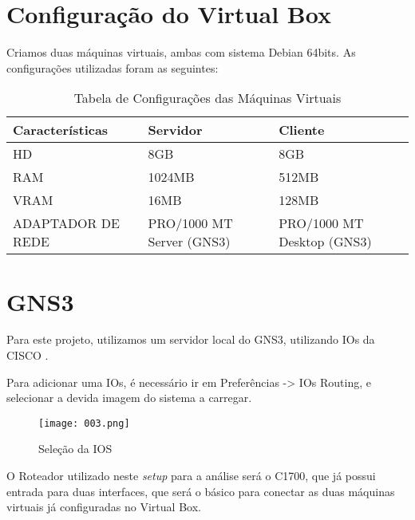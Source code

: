 \section{Configuração do Virtual Box}

Criamos duas máquinas virtuais, ambas com sistema Debian 64bits. As configurações utilizadas foram as seguintes:
   
\begin{table}[H]
\centering
\label{my-label}
\begin{tabular}{|l|l|l|}
\hline
Características   & Servidor                        & Cliente                          \\ \hline
HD                & 8GB                             & 8GB                              \\ \hline
RAM               & 1024MB                          & 512MB                            \\ \hline
VRAM              & 16MB                            & 128MB                            \\ \hline
ADAPTADOR DE REDE & PRO/1000 MT Server (GNS3) & PRO/1000 MT Desktop (GNS3) \\ \hline
\end{tabular}
\caption{Tabela de Configurações das Máquinas Virtuais}
\end{table}

\section{GNS3}

Para este projeto, utilizamos um servidor local do GNS3, utilizando IOs da CISCO \cite{ciscoios}.

Para adicionar uma IOs, é necessário ir em Preferências -> IOs Routing, e selecionar a devida imagem do sistema a carregar.


\begin{figure}[H]
\centering
\texttt{[image: 003.png]}
\caption{Seleção da IOS}
\label{Rotulo}
\end{figure}

O Roteador utilizado neste \textit{setup} para a análise será o C1700, que já possui entrada para duas interfaces, que será o básico para conectar as duas máquinas virtuais já configuradas no Virtual Box.

